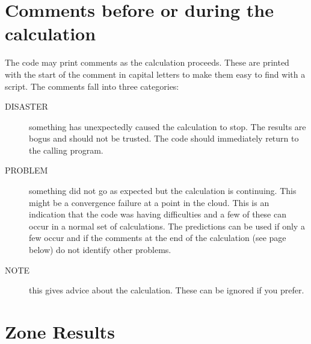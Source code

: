 \section{Comments before or during the calculation}

The code may print comments as the calculation proceeds.
These are
printed with the start of the comment in capital letters to make them easy
to find with a script.
The comments fall into three categories:
\begin{description}
\item[DISASTER] something has unexpectedly caused the calculation to stop.
The results are bogus and should not be trusted.
The code should immediately
return to the calling program.

\item[PROBLEM] something did not go as expected but the calculation is
continuing.  This might be a convergence failure at a point in the cloud.
This is an indication that the code was having difficulties and a few of
these can occur in a normal set of calculations.
The predictions can be
used if only a few occur and if the comments at the end of the calculation
(see page \pageref{sec:CommentsAfterCalculation} below)
do not identify other problems.

\item[NOTE] this gives advice about the calculation.  These can be ignored
if you prefer.
\end{description}

\section{Zone Results}

